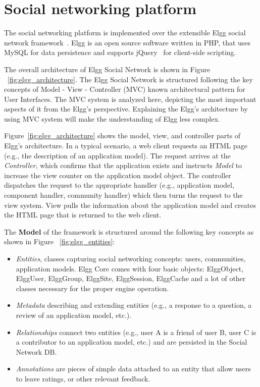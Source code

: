 \section{Social networking platform}
\label{sec:implementaion_of_social_netowrk}
The social networking platform is implemented over the extensible Elgg social network framework~\cite{elgg_url}.  Elgg is an open source software written in PHP, that uses MySQL for data persistence and supports jQuery~\cite{jquery_url} for client-side scripting.  

The overall architecture of Elgg Social Network is shown in Figure ~\ref{fig:elgg_architecture}. The Elgg Social Network is structured following the key concepts of Model - View - Controller (MVC) known architectural pattern for User Interfaces. The MVC system is analyzed here, depicting the most important aspects of it from the Elgg's perspective. Explaining the Elgg's architecture by using MVC system will make the understanding of Elgg less complex.

Figure~\ref{fig:elgg_architecture} shows the model, view, and controller parts of Elgg's architecture. In a typical scenario, a web client requests an HTML page (e.g., the description of an application model).  The request arrives at the \emph{Controller}, which confirms that the application exists and instructs \emph{Model} to increase the view counter on the application model object. The controller dispatches the request to the appropriate handler (e.g., application model, component handler, community handler) which then turns the request to the view system. View pulls the information about the application model and creates the HTML page that is returned to the web client.

The {\bf Model} of the framework is structured around the following key concepts as shown in Figure ~\ref{fig:elgg_entities}:
\begin{itemize}
\item \emph{Entities}, classes capturing social networking concepts: users, communities, application models. Elgg Core comes with four basic objects: ElggObject, ElggUser, ElggGroup, ElggSite, ElggSession, ElggCache and a lot of other classes necessary for the proper engine operation.
\item \emph{Metadata} describing and extending entities (e.g., a response to a question, a review of an application model, etc.).
\item  \emph{Relationships} connect two entities (e.g., user A is a friend of user B, user C is a contributor to an application model, etc.) and are persisted in the Social Network DB.
\item \emph{Annotations} are pieces of simple data attached to an entity that allow users to leave ratings, or other relevant feedback.
\end{itemize}


